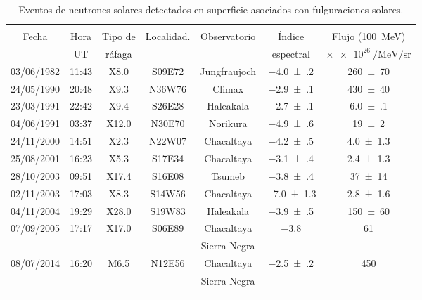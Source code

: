 \begin{table}
\caption{Eventos de neutrones solares detectados en superficie asociados con fulguraciones solares.}
\label{table:eventos-neutrones}

\begin{tabular}{ccccccc}
\multicolumn{7}{c}{}\\
\cmidrule(r){1-7}
Fecha & Hora & Tipo de & Localidad. & Observatorio & Índice & Flujo (\SI{100}{\mega\electronvolt})\\
 & UT & ráfaga &  &  & espectral & $\times\SI{e26}{\per\mega\electronvolt\per\steradian}$ \\
\addlinespace[5pt]
\cmidrule(r){1-7}
\num{03}/\num{06}/\num{1982} & 11:43 & X8.0 & S09E72 & Jungfraujoch & \num{-4.0(2)} & \num{260(70)}\\
\num{24}/\num{05}/\num{1990} & 20:48 & X9.3 & N36W76 & Climax & \num{-2.9(1)} & \num{430(40)}\\
\num{23}/\num{03}/\num{1991} & 22:42 & X9.4 & S26E28 & Haleakala & \num{-2.7(1)} & \num{6.0(1)}\\
\num{04}/\num{06}/\num{1991} & 03:37 & X12.0 & N30E70 & Norikura & \num{-4.9(6)} & \num{19(2)}\\
\num{24}/\num{11}/\num{2000} & 14:51 & X2.3 & N22W07 & Chacaltaya & \num{-4.2(5)} & \num{4.0(13)}\\
\num{25}/\num{08}/\num{2001} & 16:23 & X5.3 & S17E34 & Chacaltaya & \num{-3.1(4)} & \num{2.4(13)}\\
\num{28}/\num{10}/\num{2003} & 09:51 & X17.4 & S16E08 & Tsumeb & \num{-3.8(4)} & \num{37(14)}\\
\num{02}/\num{11}/\num{2003} & 17:03 & X8.3 & S14W56 & Chacaltaya & \num{-7.0(13)} & \num{2.8(16)}\\
\num{04}/\num{11}/\num{2004} & 19:29 & X28.0 & S19W83 & Haleakala & \num{-3.9(5)} & \num{150(60)}\\
\num{07}/\num{09}/\num{2005} & 17:17 & X17.0 & S06E89 & Chacaltaya & \num{-3.8} & \num{61}\\
 &  &  &  & Sierra Negra &  & \\
\num{08}/\num{07}/\num{2014} & 16:20 & M6.5 & N12E56 & Chacaltaya & \num{-2.5(2)} & \num{450}\\
 &  &  &  & Sierra Negra &  & \\
\addlinespace[5pt]
\bottomrule

\end{tabular}
\end{table}
